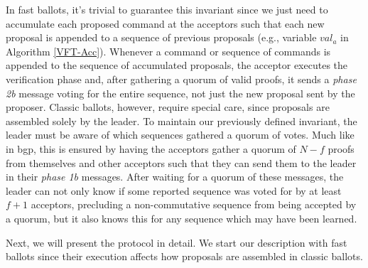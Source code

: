 In fast ballots, it's trivial to guarantee this invariant since we just need to accumulate each proposed command at the acceptors such that each new proposal is appended to a sequence of previous proposals (e.g., variable $val_a$ in Algorithm \ref{VFT-Acc}). Whenever a command or sequence  of commands is appended to the sequence of accumulated proposals, the acceptor executes the verification phase and, after gathering a quorum of valid proofs, it sends a \textit{phase 2b} message voting for the entire sequence, not just the new proposal sent by the proposer. Classic ballots, however, require special care, since proposals are assembled solely by the leader. To maintain our previously defined invariant, the leader must be aware of which sequences gathered a quorum of votes. Much like in \acrshort{bgp}, this is ensured by having the acceptors gather a quorum of $N-f$ proofs from themselves and other acceptors such that they can send them to the leader in their \textit{phase 1b} messages. After waiting for a quorum of these messages, the leader can not only know if some reported sequence was voted for by at least $f+1$ acceptors, precluding a non-commutative sequence from being accepted by a quorum, but it also knows this for any sequence which may have been learned. \par
Next, we will present the protocol in detail. We start our description with fast ballots since their execution affects how proposals are assembled in classic ballots.


